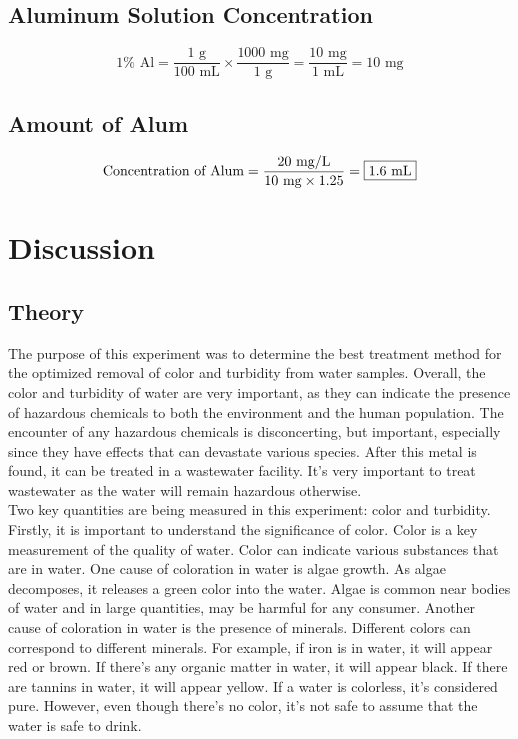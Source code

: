 \documentclass{article}
\begin{document}
    \subsection{Aluminum Solution Concentration}
    \[1\% \text{ Al}=\frac{\text{1 g}}{\text{100 mL}}\times\frac{\text{1000 mg}}{\text{1 g}}=\frac{\text{10 mg}}{\text{1 mL}}=\boxed{\text{10 mg}}\]
    \subsection{Amount of Alum}
    \[\text{Concentration of Alum}=\frac{20\text{ mg/L}}{\text{10 mg}\times 1.25}=\boxed{\text{1.6\text{ mL}}}\]
    \newpage
    \section{Discussion}
    \subsection{Theory}
    \indent The purpose of this experiment was to determine the best treatment method for the optimized removal of color and turbidity from water samples. Overall, the color and turbidity of water are very important, as they can indicate the presence of hazardous chemicals to both the environment and the human population. The encounter of any hazardous chemicals is disconcerting, but important, especially since they have effects that can devastate various species. After this metal is found, it can be treated in a wastewater facility. It's very important to treat wastewater as the water will remain hazardous otherwise.\\
    \indent Two key quantities are being measured in this experiment: color and turbidity. Firstly, it is important to understand the significance of color. Color is a key measurement of the quality of water. Color can indicate various substances that are in water. One cause of coloration in water is algae growth. As algae decomposes, it releases a green color into the water. Algae is common near bodies of water and in large quantities, may be harmful for any consumer. Another cause of coloration in water is the presence of minerals. Different colors can correspond to different minerals. For example, if iron is in water, it will appear red or brown. If there's any organic matter in water, it will appear black. If there are tannins in water, it will appear yellow. If a water is colorless, it's considered pure. However, even though there's no color, it's not safe to assume that the water is safe to drink. \\
\end{document}
